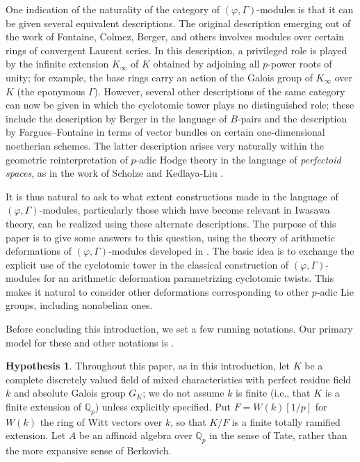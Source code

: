 \documentclass[12pt]{amsart}
\theoremstyle{definition}
\newtheorem{hypothesis}[theorem]{Hypothesis}
\numberwithin{equation}{theorem}
\newcommand{\QQ}{\mathbb{Q}}
\begin{document}
One indication of the naturality of the category of $(\varphi, \Gamma)$-modules is that it can be given several equivalent descriptions. The original description emerging out of the work of Fontaine, Colmez, Berger, and others involves modules over certain rings of convergent Laurent series. In this description, a privileged role is played by the infinite extension $K_\infty$ of $K$ obtained by adjoining all $p$-power roots of unity; for example, the base rings carry an action of the Galois group of $K_\infty$ over $K$ (the eponymous $\Gamma$). However, several other descriptions of the same category can now be given in which the cyclotomic tower plays no distinguished role; these include the description by Berger in the language of $B$-pairs and the description by Fargues--Fontaine in terms of vector bundles on certain one-dimensional noetherian schemes. The latter description arises very naturally within the geometric reinterpretation of $p$-adic Hodge theory in the language of \emph{perfectoid spaces}, as in the work of Scholze \cite{scholze1, scholze2, scholze-icm} and Kedlaya-Liu \cite{kedlaya-liu1, kedlaya-liu2}.

It is thus natural to ask to what extent constructions made in the language of $(\varphi, \Gamma)$-modules, particularly those which have become relevant in Iwasawa theory, can be realized using these alternate descriptions. The purpose of this paper is to give some answers to this question, using the theory of arithmetic deformations of $(\varphi, \Gamma)$-modules developed in \cite{kpx}. The basic idea is to exchange the explicit use of the cyclotomic tower in the classical construction of $(\varphi, \Gamma)$-modules for an arithmetic deformation parametrizing cyclotomic twists. This makes it natural to consider other deformations corresponding to other $p$-adic Lie groups, including nonabelian ones.

Before concluding this introduction, we set a few running notations. Our primary model for these and other notations is \cite{kpx}.
\setcounter{theorem}{0}
\begin{hypothesis}
Throughout this paper, as in this introduction, let $K$ be a complete discretely valued field of mixed characteristics with perfect residue field $k$ and absolute Galois group $G_K$; we do not assume $k$ is finite (i.e., that $K$ is a finite extension of $\QQ_p$) unless explicitly specified.
Put $F = W(k)[1/p]$ for $W(k)$ the ring of Witt vectors over $k$, so that $K/F$ is a finite totally ramified extension.
Let $A$ be an affinoid algebra over $\QQ_p$ in the sense of Tate, rather than the more expansive sense of Berkovich. 
\end{hypothesis}
\end{document}
